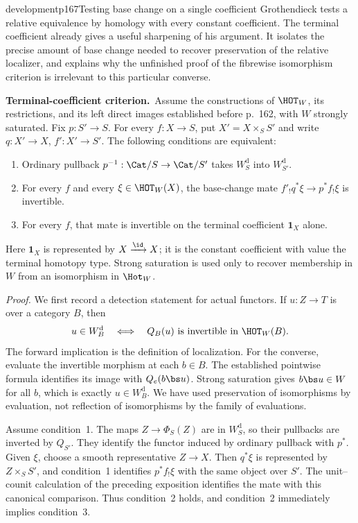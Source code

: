 \begin{dcomment}{development}{p167}{Testing base change on a single coefficient}
Grothendieck tests a relative equivalence by homology with every constant coefficient. The terminal coefficient already gives a useful sharpening of his argument. It isolates the precise amount of base change needed to recover preservation of the relative localizer, and explains why the unfinished proof of the fibrewise isomorphism criterion is irrelevant to this particular converse.

\textbf{Terminal-coefficient criterion.}\ours\
Assume the constructions of $\HOT_W$, its restrictions, and its left direct images established before p.~162, with $W$ strongly saturated. Fix $p:S'\to S$. For every $f:X\to S$, put $X'=X\times_S S'$ and write $q:X'\to X$, $f':X'\to S'$. The following conditions are equivalent:
\begin{enumerate}
\item Ordinary pullback $p^{-1}:\Cat/S\to\Cat/S'$ takes $W_S^{\mathrm d}$ into $W_{S'}^{\mathrm d}$.
\item For every $f$ and every $\xi\in\HOT_W(X)$, the base-change mate $f'_!q^*\xi\to p^*f_!\xi$ is invertible.
\item For every $f$, that mate is invertible on the terminal coefficient $\mathbf1_X$ alone.
\end{enumerate}
Here $\mathbf1_X$ is represented by $X\xrightarrow{\id}X$; it is the constant coefficient with value the terminal homotopy type. Strong saturation is used only to recover membership in $W$ from an isomorphism in $\Hot_W$.

\textit{Proof.} We first record a detection statement for actual functors. If $u:Z\to T$ is over a category $B$, then
\[
 u\in W_B^{\mathrm d}\quad\Longleftrightarrow\quad
 Q_B(u)\text{ is invertible in }\HOT_W(B).
\]
The forward implication is the definition of localization. For the converse, evaluate the invertible morphism at each $b\in B$. The established pointwise formula identifies its image with $Q_e(b\bs u)$. Strong saturation gives $b\bs u\in W$ for all $b$, which is exactly $u\in W_B^{\mathrm d}$. We have used preservation of isomorphisms by evaluation, not reflection of isomorphisms by the family of evaluations.

Assume condition~1. The maps $Z\to\Phi_S(Z)$ are in $W_S^{\mathrm d}$, so their pullbacks are inverted by $Q_{S'}$. They identify the functor induced by ordinary pullback with $p^*$. Given $\xi$, choose a smooth representative $Z\to X$. Then $q^*\xi$ is represented by $Z\times_S S'$, and condition~1 identifies $p^*f_!\xi$ with the same object over $S'$. The unit--counit calculation of the preceding exposition identifies the mate with this canonical comparison. Thus condition~2 holds, and condition~2 immediately implies condition~3.


\end{dcomment}
